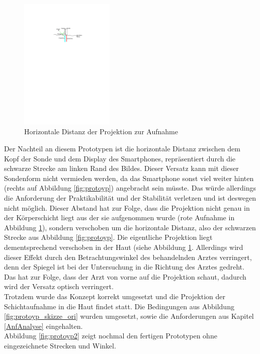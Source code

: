 \begin{figure}
\centering
\includegraphics*[width =0.4\textwidth]{Prototypen_Bau/Horizontale_distanz}
\caption{{\small Horizontale Distanz der Projektion zur Aufnahme}}
\label{fig:horizontale_distanz}
\end{figure}
Der Nachteil an diesem Prototypen ist die horizontale Distanz zwischen dem Kopf der Sonde und dem Display des Smartphones, repräsentiert durch die schwarze Strecke am linken Rand des Bildes. Dieser Versatz kann mit dieser Sondenform nicht vermieden werden, da das Smartphone sonst viel weiter hinten (rechts auf Abbildung \ref{fig:protoyp}) angebracht sein müsste. Das würde allerdings die Anforderung der Praktikabilität und der Stabilität verletzen und ist deswegen nicht möglich. Dieser Abstand hat zur Folge, dass die Projektion nicht genau in der Körperschicht liegt aus der sie aufgenommen wurde (rote Aufnahme in Abbildung \ref{fig:horizontale_distanz}), sondern verschoben um die horizontale Distanz, also der schwarzen Strecke aus Abbildung \ref{fig:protoyp}. Die eigentliche Projektion liegt dementsprechend verschoben in der Haut (siehe Abbildung \ref{fig:horizontale_distanz}.  Allerdings wird dieser Effekt durch den Betrachtungswinkel des behandelnden Arztes verringert, denn der Spiegel ist bei der Untersuchung in die Richtung des Arztes gedreht. Das hat zur Folge, dass der Arzt von vorne auf die Projektion schaut, dadurch wird der Versatz optisch verringert.\\
Trotzdem wurde das Konzept korrekt umgesetzt und die Projektion der Schichtaufnahme in die Haut findet statt. Die Bedingungen aus Abbildung \ref{fig:protoyp_skizze_ori} wurden umgesetzt, sowie die Anforderungen aus Kapitel \ref{AnfAnalyse} eingehalten.\\ 
Abbildung \ref{fig:protoyp2} zeigt nochmal den fertigen Prototypen ohne eingezeichnete Strecken und Winkel.
